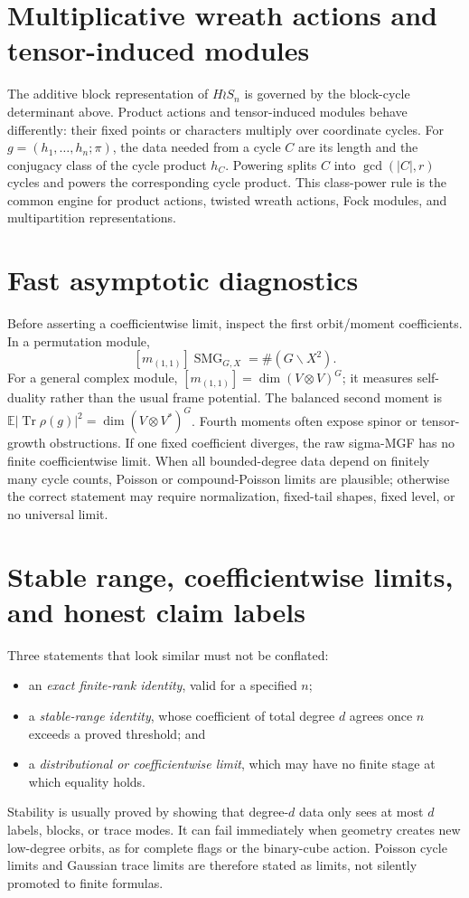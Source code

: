 \documentclass[10pt]{article}
\newcommand{\Tr}{\operatorname{Tr}}
\newcommand{\SMG}{\operatorname{SMG}}
\newcommand{\MGF}{\SMG}
\begin{document}
\section{Multiplicative wreath actions and tensor-induced modules}

The additive block representation of $H\wr S_n$ is governed by the
block-cycle determinant above.  Product actions and tensor-induced modules
behave differently: their fixed points or characters multiply over coordinate
cycles.  For $g=(h_1,\ldots,h_n;\pi)$, the data needed from a cycle $C$ are
its length and the conjugacy class of the cycle product $h_C$.  Powering splits
$C$ into $\gcd(|C|,r)$ cycles and powers the corresponding cycle product.
This class-power rule is the common engine for product actions, twisted wreath
actions, Fock modules, and multipartition representations.

\section{Fast asymptotic diagnostics}

Before asserting a coefficientwise limit, inspect the first orbit/moment
coefficients.  In a permutation module,
\[
 [m_{(1,1)}]\MGF_{G,X}=\#(G\backslash X^2).
\]
For a general complex module, $[m_{(1,1)}]=\dim(V\otimes V)^G$; it
measures self-duality rather than the usual frame potential. The balanced
second moment is $\mathbb E|\Tr\rho(g)|^2=\dim(V\otimes V^*)^G$. Fourth
moments often expose spinor or tensor-growth obstructions.  If one fixed coefficient
diverges, the raw sigma-MGF has no finite coefficientwise limit.  When all
bounded-degree data depend on finitely many cycle counts, Poisson or
compound-Poisson limits are plausible; otherwise the correct statement may
require normalization, fixed-tail shapes, fixed level, or no universal limit.

\section{Stable range, coefficientwise limits, and honest claim labels}

Three statements that look similar must not be conflated:
\begin{itemize}
\item an \emph{exact finite-rank identity}, valid for a specified $n$;
\item a \emph{stable-range identity}, whose coefficient of total degree $d$
agrees once $n$ exceeds a proved threshold; and
\item a \emph{distributional or coefficientwise limit}, which may have no
finite stage at which equality holds.
\end{itemize}
Stability is usually proved by showing that degree-$d$ data only sees at most
$d$ labels, blocks, or trace modes.  It can fail immediately when geometry
creates new low-degree orbits, as for complete flags or the binary-cube action.
Poisson cycle limits and Gaussian trace limits are therefore stated as limits,
not silently promoted to finite formulas.
\end{document}
